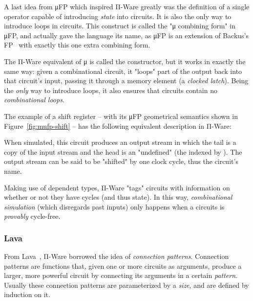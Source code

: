        A last idea from μFP which inspired Π-Ware greatly was the definition of a
        single operator capable of introducing \emph{state} into circuits.
        It is also the only way to introduce loops in circuits.
        This construct is called the "μ combining form" in μFP, and actually gave the language its name,
        as μFP is an extension of Backus's FP~\cite{backus-turing-lecture} with exactly this one
        extra combining form.

        The Π-Ware equivalent of μ is called the  constructor, but it works in exactly the same way:
        given a combinational circuit, it "loops" part of the output back into that circuit's input,
        passing it through a memory element (a \emph{clocked latch}).
        Being the \emph{only} way to introduce loops, it also ensures that circuits contain no
        \emph{combinational loops}.

        The example of a shift register – with its μFP geometrical semantics shown in
        Figure~\ref{fig:mufp-shift} – has the following equivalent description in Π-Ware:

        \begin{center}
        \end{center}

        When simulated, this circuit produces an output stream in which the tail is a copy of the
        input stream and the head is an "undefined"  (the  indexed by ).
        The output stream can be said to be "shifted" by one clock cycle, thus the circuit's name.

        Making use of dependent types, Π-Ware "tags" circuits with information on whether or not
        they have cycles (and thus state).
        In this way, \emph{combinational simulation} (which disregards past inputs) only happens
        when a circuits is \emph{provably} cycle-free.

        \subsubsection{Lava}
        \label{subsubsec:discussion-lava}
        From Lava~\cite{observable-sharing-circuits}, Π-Ware borrowed the idea of \emph{connection patterns}.
        Connection patterns are functions that, given one or more circuits as arguments,
        produce a larger, more powerful circuit by connecting its arguments in a certain \emph{pattern}.
        Usually these connection patterns are parameterized by a \emph{size},
        and are defined by induction on it.

